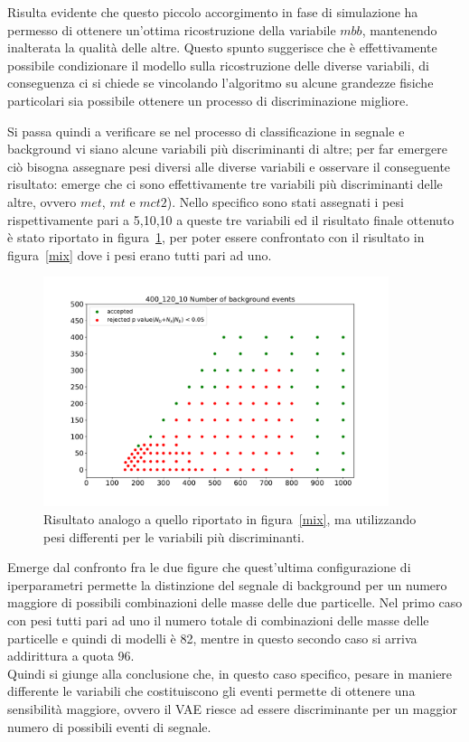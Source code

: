 Risulta evidente che questo piccolo accorgimento in fase di simulazione ha permesso di ottenere un'ottima ricostruzione della variabile $\textit{mbb}$, mantenendo inalterata la qualità delle altre. Questo spunto suggerisce che è effettivamente possibile condizionare il modello sulla ricostruzione delle diverse variabili, di conseguenza ci si chiede se vincolando l'algoritmo su alcune grandezze fisiche particolari sia possibile ottenere un processo di discriminazione migliore.

\newpage

Si passa quindi a verificare se nel processo di classificazione in segnale e background vi siano alcune variabili più discriminanti di altre; per far emergere ciò bisogna assegnare pesi diversi alle diverse variabili e osservare il conseguente risultato: emerge che ci sono effettivamente tre variabili più discriminanti delle altre, ovvero $\textit{met}$, $\textit{mt}$ e $\textit{mct2}$). Nello specifico sono stati assegnati i pesi rispettivamente pari a 5,10,10 a queste tre variabili ed il risultato finale ottenuto è stato riportato in figura~\ref{mix_ottimizzato}, per poter essere confrontato con il risultato in figura~\ref{mix} dove i pesi erano tutti pari ad uno.

\begin{figure}[h!]
	\centering
	\includegraphics[width=0.90\textwidth]{figs/risultati_simulazione/mix_ottimizzato.pdf}
	\caption{Risultato analogo a quello riportato in figura~\ref{mix}, ma utilizzando pesi differenti per le variabili più discriminanti.}
	\label{mix_ottimizzato}
\end{figure}

Emerge dal confronto fra le due figure che quest'ultima configurazione di iperparametri permette la distinzione del segnale di background per un numero maggiore di possibili combinazioni delle masse delle due particelle. Nel primo caso con pesi tutti pari ad uno il numero totale di combinazioni delle masse delle particelle e quindi di modelli è 82, mentre in questo secondo caso si arriva addirittura a quota 96. \\
Quindi si giunge alla conclusione che, in questo caso specifico, pesare in maniere differente le variabili che costituiscono gli eventi permette di ottenere una sensibilità maggiore, ovvero il VAE riesce ad essere discriminante per un maggior numero di possibili eventi di segnale.

